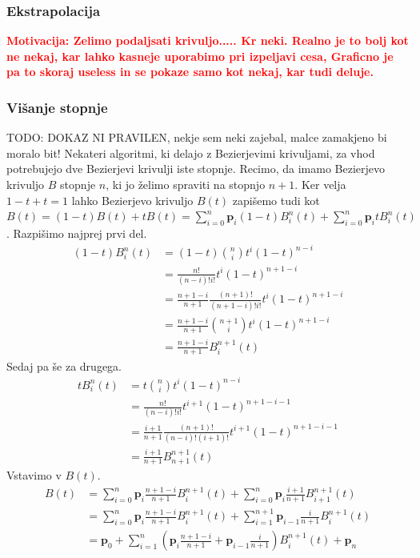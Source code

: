 \documentclass[isrm2, tisk]{fmfdelo}
\newcommand{\mycomment}[1]{\textbf{\textcolor{red}{#1}}}
\begin{document}
    \subsubsection{Ekstrapolacija}
    \mycomment{Motivacija: Zelimo podaljsati krivuljo..... Kr neki. Realno je to bolj kot ne nekaj, kar lahko kasneje uporabimo pri izpeljavi cesa, Graficno je pa to skoraj useless in se pokaze samo kot nekaj, kar tudi deluje.}

    \subsubsection{Višanje stopnje}
    TODO: DOKAZ NI PRAVILEN, nekje sem neki zajebal, malce zamakjeno bi moralo bit!
    Nekateri algoritmi, ki delajo z Bezierjevimi krivuljami, za vhod potrebujejo dve Bezierjevi krivulji iste stopnje.
    Recimo, da imamo Bezierjevo krivuljo $B$ stopnje $n$, ki jo želimo spraviti na stopnjo $n+1$.
    Ker velja $1-t+t=1$ lahko Bezierjevo krivuljo $B(t)$ zapišemo tudi kot $B(t) = (1-t)B(t)+tB(t) = \sum_{i=0}^{n}\mathbf{p}_{i}(1-t)B_i^n(t) +\sum_{i=0}^{n}\mathbf{p}_{i}tB_i^n(t) $.
    Razpišimo najprej prvi del.
    \begin{align*}
    (1-t)
        B_i^n(t) &= (1-t)\binom{n}{i}t^i(1-t)^{n-i} \\
        &= \frac{n!}{(n-i)!i!}t^i(1-t)^{n+1-i} \\
        &=\frac{n+1-i}{n+1}\frac{(n+1)!}{(n+1-i)!i!}t^i(1-t)^{n+1-i}\\
        &=\frac{n+1-i}{n+1} \binom{n+1}{i}t^i(1-t)^{n+1-i} \\
        &=\frac{n+1-i}{n+1}B_{i}^{n+1}(t)
    \end{align*}
    Sedaj pa še za drugega.
    \begin{align*}
        tB_i^n(t) &= t\binom{n}{i}t^i(1-t)^{n-i} \\
        &= \frac{n!}{(n-i)!i!}t^{i+1}(1-t)^{n+1-i-1} \\
        &= \frac{i+1}{n+1}\frac{(n+1)!}{(n-i)!(i+1)!}t^{i+1}(1-t)^{n+1-i-1} \\
        &= \frac{i+1}{n+1}B_{n+1}^{n+1}(t)
    \end{align*}
    Vstavimo v $B(t)$.
    \begin{align*}
        B(t) &= \sum_{i=0}^{n}\mathbf{p}_{i}\frac{n+1-i}{n+1}B_{i}^{n+1}(t) +\sum_{i=0}^{n}\mathbf{p}_{i}\frac{i+1}{n+1}B_{i+1}^{n+1}(t)\\
        &= \sum_{i=0}^{n}\mathbf{p}_{i}\frac{n+1-i}{n+1}B_{i}^{n+1}(t) +\sum_{i=1}^{n+1}\mathbf{p}_{i-1}\frac{i}{n+1}B_{i}^{n+1}(t) \\
        &=\mathbf{p}_{0} + \sum_{i=1}^{n}\left(\mathbf{p}_{i}\frac{n+1-i}{n+1} + \mathbf{p}_{i-1}\frac{i}{n+1}\right)B_{i}^{n+1}(t)+\mathbf{p}_{n}
    \end{align*}
\end{document}
